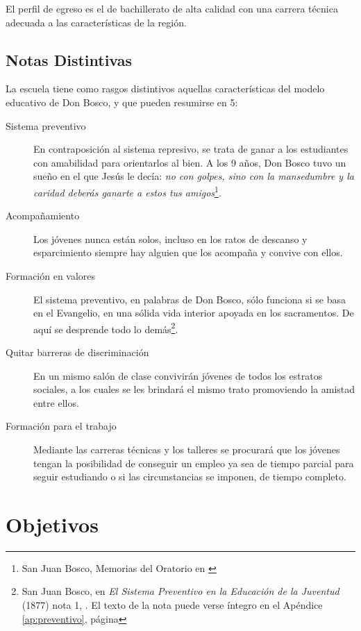 El perfil de egreso es el de bachillerato de alta calidad con una carrera técnica adecuada a las características de la región.

\subsection{Notas Distintivas}
\label{sub:intro:NotasDistintivas}

La escuela tiene como rasgos distintivos aquellas características del modelo educativo de Don Bosco, y que pueden resumirse en 5:

\begin{description}
	\item[Sistema preventivo] En contraposición al sistema represivo, se trata de ganar a los estudiantes con amabilidad para orientarlos al bien. A los 9 años, Don Bosco tuvo un sueño en el que Jesús le decía: \emph{no con golpes, sino con la mansedumbre y la caridad deberás ganarte a estos tus amigos}\footnote{San Juan Bosco, Memorias del Oratorio en \citep{Canals95}}.

	\item[Acompañamiento] Los jóvenes nunca están solos, incluso en los ratos de descanso y esparcimiento siempre hay alguien que los acompaña y convive con ellos.
	
	\item[Formación en valores] El sistema preventivo, en palabras de Don Bosco, sólo funciona si se basa en el Evangelio, en una sólida vida interior apoyada en los sacramentos. De aquí se desprende todo lo demás\footnote{San Juan Bosco, en \emph{El Sistema Preventivo en la Educación de la Juventud} (1877) nota 1, \citep{Canals95}. El texto de la nota puede verse íntegro en el Apéndice \ref{ap:preventivo}, página \pageref{ap:preventivo}}.

	\item[Quitar barreras de discriminación] En un mismo salón de clase convivirán jóvenes de todos los estratos sociales, a los cuales se les brindará el mismo trato promoviendo la amistad entre ellos.

	\item[Formación para el trabajo] Mediante las carreras técnicas y los talleres se procurará que los jóvenes tengan la posibilidad de conseguir un empleo ya sea de tiempo parcial para seguir estudiando o si las circunstancias se imponen, de tiempo completo.
\end{description}

\section{Objetivos}

